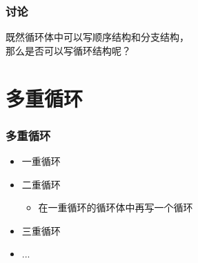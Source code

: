 \begin{frame}[fragile]
    \frametitle{讨论}

    \begin{block}{}
        \vspace{.5cm}
        \begin{center}
            {\large 既然循环体中可以写顺序结构和分支结构，\\那么是否可以写循环结构呢？}
        \end{center}
        \vspace{.5cm}
    \end{block}

\end{frame}


\section{多重循环}

\begin{frame}[fragile]
    \frametitle{多重循环}

    \begin{itemize}[<+->]
        \item 一重循环
        \item 二重循环

            \begin{itemize}
                \item 在一重循环的循环体中再写一个循环
            \end{itemize}

        \item 三重循环
        \item ...
    \end{itemize}
\end{frame}

